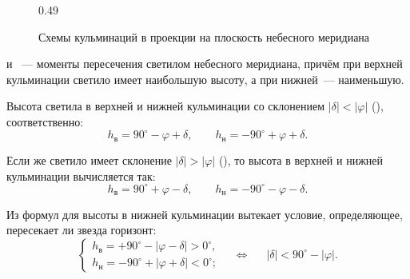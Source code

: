 \begin{figure}[h!]
\begin{subcaptionblock}{0.49\tw}
		\caption{$|\delta| > |\varphi|$}
		\label{pic:culmination-greater}
	\end{subcaptionblock}
	\caption{Схемы кульминаций в проекции на плоскость небесного меридиана}
	\label{}    
\end{figure}

 и ~--- моменты пересечения светилом небесного меридиана, причём при верхней кульминации светило имеет наибольшую высоту, а при нижней~--- наименьшую.

Высота светила в верхней и нижней кульминации со склонением $|\delta| < |\varphi|$ (), соответственно:
\begin{equation}
	h_{\text{в}}= 90^\circ - \varphi + \delta, \quad\quad
	h_{\text{н}}= - 90^\circ + \varphi  + \delta.
\end{equation}

Если же светило имеет склонение $|\delta| > |\varphi|$ (), то высота в верхней и нижней кульминации вычисляется так:
\begin{equation}
	h_{\text{в}}= 90^\circ + \varphi - \delta, \quad\quad
	h_{\text{н}}= - 90^\circ -\varphi - \delta.
\end{equation}

Из формул для высоты в нижней кульминации вытекает условие, определяющее, пересекает ли звезда горизонт:
\begin{equation}
	\begin{cases}
		h_\text{в} = +90^\circ - |\varphi - \delta| > 0^\circ,\\
		h_\text{н} = - 90^\circ + |\varphi + \delta| < 0^\circ;
	\end{cases}
	\quad \Longleftrightarrow \quad~~ |\delta|< 90^{\circ} - |\varphi|.
\end{equation}


